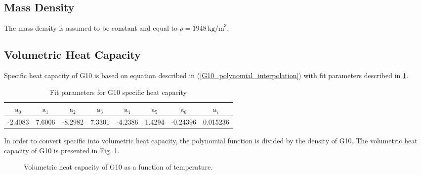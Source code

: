  \subsection{Mass Density}
 The mass density is assumed to be constant and equal to $\rho = 1948~\text{kg/m}^{3}$.

\subsection{Volumetric Heat Capacity}
Specific heat capacity of G10 is based on equation described in (\ref{G10_polynomial_interpolation}) with fit parameters described in \ref{table:nist_g10_cp_parameters}. 

\begin{table}[H]
    \caption{Fit parameters for G10 specific heat capacity} 
    \vspace{-1.em} 
    \fontsize{10}{10}
    \selectfont 
    \renewcommand{\arraystretch}{1.5}
    \begin{center}
    \begin{tabular}{ cccccccc }  
    $\text{a}_0$ & $\text{a}_1$ & $\text{a}_2$ & $\text{a}_3$ & $\text{a}_4$ & $\text{a}_5$ & $\text{a}_6$ & $\text{a}_7$ \\
    \hline
    -2.4083 & 7.6006 & -8.2982 & 7.3301 & -4.2386 & 1.4294 & -0.24396 & 0.015236 \\
    \hline 
    \end{tabular}
    \end{center}  
     \label{table:nist_g10_cp_parameters} 
 \end{table}

In order to convert specific into volumetric heat capacity, the polynomial function is divided by the density of G10. The volumetric heat capacity of G10 is presented in Fig. \ref{fig:g10_cv_plot}.

\begin{figure}[H]
    \centering
    \caption{Volumetric heat capacity of G10 as a function of temperature.}
    \label{fig:g10_cv_plot}
\end{figure}
